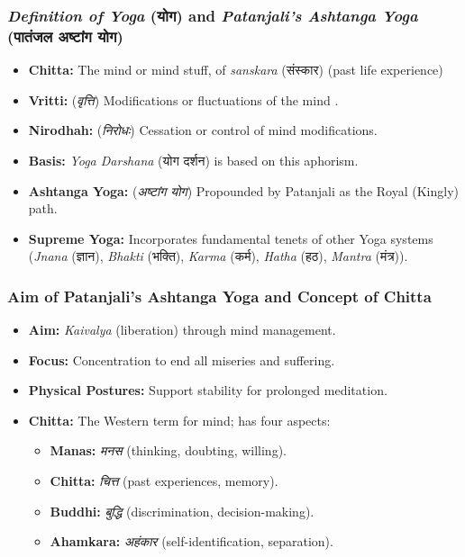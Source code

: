 \begin{frame}[fragile]\frametitle{\textit{Definition of Yoga} (योग) and \textit{Patanjali's Ashtanga Yoga} (पातंजल अष्टांग योग)}

    \begin{itemize}
        \item \textbf{Chitta:} The mind or mind stuff, of \textit{sanskara} (संस्कार) (past life experience)
        \item \textbf{Vritti:} (\textit{वृत्ति}) Modifications or fluctuations of the mind .
        \item \textbf{Nirodhah:}  (\textit{निरोधः}) Cessation or control of mind modifications.
        \item \textbf{Basis:} \textit{Yoga Darshana} (योग दर्शन) is based on this aphorism.
        \item \textbf{Ashtanga Yoga:}  (\textit{अष्टांग योग}) Propounded by Patanjali as the Royal (Kingly) path.
        \item \textbf{Supreme Yoga:} Incorporates fundamental tenets of other Yoga systems (\textit{Jnana} (ज्ञान), \textit{Bhakti} (भक्ति), \textit{Karma} (कर्म), \textit{Hatha} (हठ), \textit{Mantra} (मंत्र)).
    \end{itemize}

\end{frame}


\begin{frame}[fragile]\frametitle{Aim of Patanjali’s Ashtanga Yoga and Concept of Chitta}

    \begin{itemize}
        \item \textbf{Aim:} \textit{Kaivalya} (liberation) through mind management.
        \item \textbf{Focus:} Concentration to end all miseries and suffering.
        \item \textbf{Physical Postures:} Support stability for prolonged meditation.
        \item \textbf{Chitta:} The Western term for mind; has four aspects:
        \begin{itemize}
            \item \textbf{Manas:} \textit{मनस} (thinking, doubting, willing).
            \item \textbf{Chitta:} \textit{चित्त} (past experiences, memory).
            \item \textbf{Buddhi:} \textit{बुद्धि} (discrimination, decision-making).
            \item \textbf{Ahamkara:} \textit{अहंकार} (self-identification, separation).
        \end{itemize}
    \end{itemize}

\end{frame}

